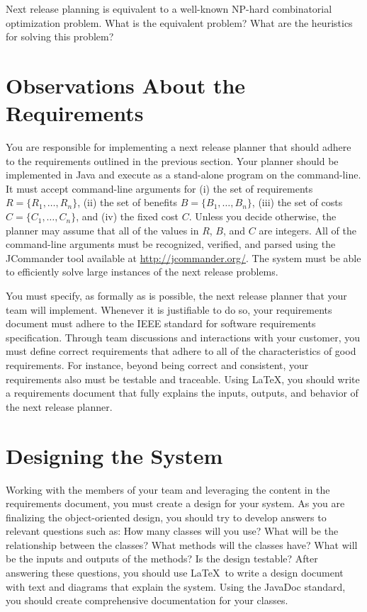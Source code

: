 Next release planning is equivalent to a well-known NP-hard combinatorial optimization problem.  What is the
equivalent problem? What are the heuristics for solving this problem?

\section*{Observations About the Requirements}

You are responsible for implementing a next release planner that should adhere to the requirements outlined in the
previous section.  Your planner should be implemented in Java and execute as a stand-alone program on the command-line.
It must accept command-line arguments for (i) the set of requirements $R = \{ R_1, \ldots, R_n \}$, (ii) the set of
benefits $B = \{ B_1, \ldots, B_n \}$, (iii) the set of costs $C = \{ C_1, \ldots, C_n \}$, and (iv) the
fixed cost $C$. Unless you decide otherwise, the planner may assume that all of the values in $R$, $B$, and $C$ are
integers. All of the command-line arguments must be recognized, verified, and parsed using the JCommander tool available
at \url{http://jcommander.org/}. The system must be able to efficiently solve large instances of the next release problems.

You must specify, as formally as is possible, the next release planner that your team will implement.  Whenever it is
justifiable to do so, your requirements document must adhere to the IEEE standard for software requirements
specification.  Through team discussions and interactions with your customer, you must define correct requirements that
adhere to all of the characteristics of good requirements.  For instance, beyond being correct and consistent, your
requirements also must be testable and traceable.  Using \LaTeX, you should write a requirements document that fully explains
the inputs, outputs, and behavior of the next release planner.

\section*{Designing the System}

Working with the members of your team and leveraging the content in the requirements document, you must create a
design for your system.  As you are finalizing the object-oriented design, you should try to develop answers to relevant
questions such as: How many classes will you use? What will be the relationship between the classes? What methods will
the classes have? What will be the inputs and outputs of the methods?  Is the design testable?  After answering these
questions, you should use \LaTeX\  to write a design document with text and diagrams that explain the system. Using the
JavaDoc standard, you should create comprehensive documentation for your classes.

